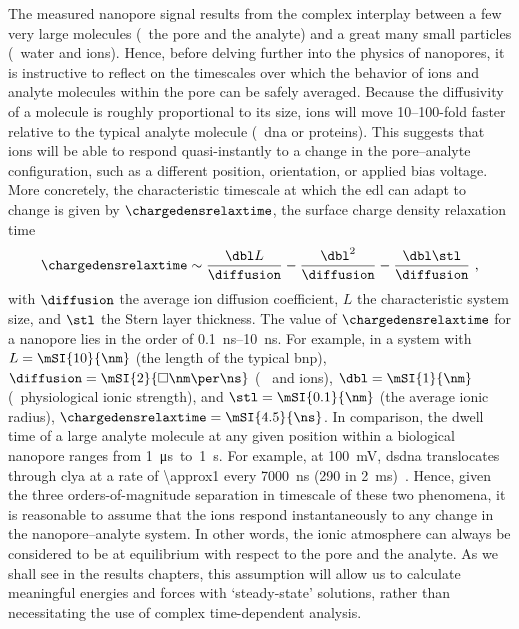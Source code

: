 The measured nanopore signal results from the complex interplay between a few very large molecules (\ie~the
pore and the analyte) and a great many small particles (\ie~water and ions). Hence, before delving further
into the physics of nanopores, it is instructive to reflect on the timescales over which the behavior of ions
and analyte molecules within the pore can be safely averaged. Because the diffusivity of a molecule is roughly
proportional to its size, ions will move \numrange{10}{100}-fold faster relative to the typical analyte
molecule (\ie~\gls{dna} or proteins). This suggests that ions will be able to respond quasi-instantly to a
change in the pore--analyte configuration, such as a different position, orientation, or applied bias voltage.
More concretely, the characteristic timescale at which the \gls{edl} can adapt to change is given by
$\chargedensrelaxtime$, the surface charge density relaxation time~\cite{Bazant-2004}
%
\begin{equation}\label{eq:nanopores_relaxation_time}
  \chargedensrelaxtime \sim \dfrac{\dbl L}{\diffusion} 
                            - \dfrac{\dbl^2}{\diffusion}
                            - \dfrac{\dbl \stl}{\diffusion}
  \text{ ,}
\end{equation}
%
with $\diffusion$ the average ion diffusion coefficient, $L$ the characteristic system size, and $\stl$ the
Stern layer thickness. The value of $\chargedensrelaxtime$ for a nanopore lies in the order of
\SIrange{0.1}{10}{\ns}. For example, in a system with $L = \mSI{10}{\nm}$ (the length of the typical
\gls{bnp}), $\diffusion = \mSI{2}{\square\nm\per\ns}$ (\eg~ and  ions), $\dbl = \mSI{1}{\nm}$
(\ie~physiological ionic strength), and $\stl = \mSI{0.1}{\nm}$ (the average ionic radius),
$\chargedensrelaxtime = \mSI{4.5}{\ns}$. In comparison, the dwell time of a large analyte molecule at any
given position within a biological nanopore ranges from \SI{1}{\us}~to~\SI{1}{\second}. For example, at
\SI{+100}{\mV}, \gls{dsdna} translocates through \gls{clya} at a rate of \SI{\approx1}{\bp} every
\SI{7000}{\ns} (\SI{290}{\bp} in \SI{2}{\ms})~\cite{Franceschini-2013}. Hence, given the three
orders-of-magnitude separation in timescale of these two phenomena, it is reasonable to assume that the ions
respond instantaneously to any change in the nanopore--analyte system. In other words, the ionic
atmosphere can always be considered to be at equilibrium with respect to the pore and the analyte. As we shall
see in the results chapters, this assumption will allow us to calculate meaningful energies and forces with
`steady-state' solutions, rather than necessitating the use of complex time-dependent analysis.



